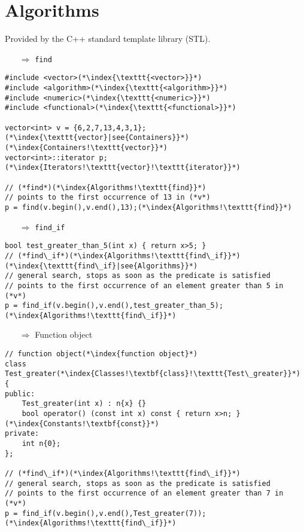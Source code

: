 \documentclass[10pt]{article}
\begin{document}
\section{Algorithms}
\small
Provided by the C++ standard template library (STL).
\begin{enumerate}
\item[$\Rightarrow$]  \texttt{find}
\end{enumerate}
\begin{lstlisting}
#include <vector>(*\index{\texttt{<vector>}}*)
#include <algorithm>(*\index{\texttt{<algorithm>}}*)
#include <numeric>(*\index{\texttt{<numeric>}}*)
#include <functional>(*\index{\texttt{<functional>}}*)

vector<int> v = {6,2,7,13,4,3,1};(*\index{\texttt{vector}|see{Containers}}*)(*\index{Containers!\texttt{vector}}*)
vector<int>::iterator p;(*\index{Iterators!\texttt{vector}!\texttt{iterator}}*)

// (*find*)(*\index{Algorithms!\texttt{find}}*)
// points to the first occurrence of 13 in (*v*)
p = find(v.begin(),v.end(),13);(*\index{Algorithms!\texttt{find}}*)
\end{lstlisting}
\begin{enumerate}
\item[$\Rightarrow$]  \texttt{find\_if}
\end{enumerate}
\begin{lstlisting}
bool test_greater_than_5(int x) { return x>5; }
// (*find\_if*)(*\index{Algorithms!\texttt{find\_if}}*)(*\index{\texttt{find\_if}|see{Algorithms}}*)
// general search, stops as soon as the predicate is satisfied
// points to the first occurrence of an element greater than 5 in (*v*)
p = find_if(v.begin(),v.end(),test_greater_than_5);(*\index{Algorithms!\texttt{find\_if}}*)
\end{lstlisting}
\begin{enumerate}
\item[$\Rightarrow$] Function object
\end{enumerate}
\begin{lstlisting}
// function object(*\index{function object}*)
class Test_greater(*\index{Classes!\textbf{class}!\texttt{Test\_greater}}*)
{
public:
    Test_greater(int x) : n{x} {}
    bool operator() (const int x) const { return x>n; }(*\index{Constants!\textbf{const}}*)
private:
    int n{0};
};

// (*find\_if*)(*\index{Algorithms!\texttt{find\_if}}*)
// general search, stops as soon as the predicate is satisfied
// points to the first occurrence of an element greater than 7 in (*v*)
p = find_if(v.begin(),v.end(),Test_greater(7));(*\index{Algorithms!\texttt{find\_if}}*)
\end{lstlisting}
\end{document}
